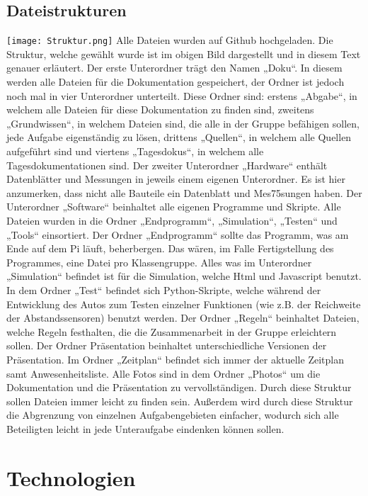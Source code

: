 \documentclass[notitlepage]{report}
\begin{document}
\subsection{Dateistrukturen}

\texttt{[image: Struktur.png]}
Alle Dateien wurden auf Github hochgeladen. Die Struktur, welche gew\"{a}hlt wurde ist im obigen Bild dargestellt und in diesem Text genauer erl\"{a}utert. 
Der erste Unterordner tr\"{a}gt den Namen „Doku“. In diesem werden alle Dateien f\"{u}r die Dokumentation gespeichert, der Ordner ist jedoch noch mal in vier Unterordner unterteilt. Diese Ordner sind: erstens „Abgabe“, in welchem alle Dateien f\"{u}r diese Dokumentation zu finden sind, zweitens „Grundwissen“, in welchem Dateien sind, die alle in der Gruppe bef\"{a}higen sollen, jede Aufgabe eigenst\"{a}ndig zu l\"{o}sen, drittens „Quellen“, in welchem alle Quellen aufgef\"{u}hrt sind und viertens „Tagesdokus“, in welchem alle Tagesdokumentationen sind.
Der zweiter Unterordner „Hardware“ enth\"{a}lt Datenbl\"{a}tter und Messungen in jeweils einem eigenen Unterordner. Es ist hier anzumerken, dass nicht alle Bauteile ein Datenblatt und Mes75sungen haben.
Der Unterordner „Software“ beinhaltet alle eigenen Programme und Skripte. Alle Dateien wurden in die Ordner „Endprogramm“, „Simulation“, „Testen“ und „Tools“ einsortiert. Der Ordner „Endprogramm“ sollte das Programm, was am Ende auf dem Pi l\"{a}uft, beherbergen. Das w\"{a}ren, im Falle Fertigstellung des Programmes, eine Datei pro Klassengruppe.  Alles was im Unterordner „Simulation“ befindet ist f\"{u}r die Simulation, welche Html und Javascript benutzt. In dem Ordner „Test“ befindet sich Python-Skripte, welche w\"{a}hrend der Entwicklung des Autos zum Testen einzelner Funktionen (wie z.B. der Reichweite der Abstandssensoren) benutzt werden.
Der Ordner „Regeln“ beinhaltet Dateien, welche Regeln festhalten, die die Zusammenarbeit in der Gruppe erleichtern sollen. Der Ordner Pr\"{a}sentation beinhaltet unterschiedliche Versionen der Pr\"{a}sentation. Im Ordner „Zeitplan“ befindet sich immer der aktuelle Zeitplan samt Anwesenheitsliste.  Alle Fotos sind in dem Ordner „Photos“ um die Dokumentation und die Pr\"{a}sentation zu vervollst\"{a}ndigen. 
Durch diese Struktur sollen Dateien immer leicht zu finden sein. Au{\ss}erdem wird durch diese Struktur die Abgrenzung von einzelnen Aufgabengebieten einfacher, wodurch sich alle Beteiligten leicht in jede Unteraufgabe eindenken k\"{o}nnen sollen. 


\section{Technologien}
\end{document}
